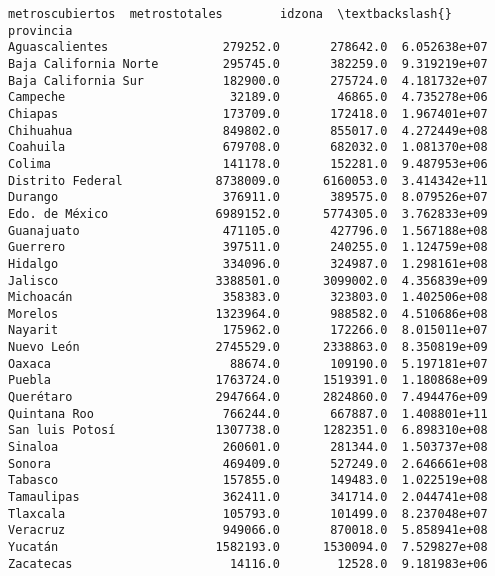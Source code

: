 \documentclass[11pt]{article}
\begin{document}
\begin{tcolorbox}[breakable, boxrule=.5pt, size=fbox, pad at break*=1mm, opacityfill=0]
\begin{Verbatim}[commandchars=\\\{\}]
                       metroscubiertos  metrostotales        idzona  \textbackslash{}
provincia
Aguascalientes                279252.0       278642.0  6.052638e+07
Baja California Norte         295745.0       382259.0  9.319219e+07
Baja California Sur           182900.0       275724.0  4.181732e+07
Campeche                       32189.0        46865.0  4.735278e+06
Chiapas                       173709.0       172418.0  1.967401e+07
Chihuahua                     849802.0       855017.0  4.272449e+08
Coahuila                      679708.0       682032.0  1.081370e+08
Colima                        141178.0       152281.0  9.487953e+06
Distrito Federal             8738009.0      6160053.0  3.414342e+11
Durango                       376911.0       389575.0  8.079526e+07
Edo. de México               6989152.0      5774305.0  3.762833e+09
Guanajuato                    471105.0       427796.0  1.567188e+08
Guerrero                      397511.0       240255.0  1.124759e+08
Hidalgo                       334096.0       324987.0  1.298161e+08
Jalisco                      3388501.0      3099002.0  4.356839e+09
Michoacán                     358383.0       323803.0  1.402506e+08
Morelos                      1323964.0       988582.0  4.510686e+08
Nayarit                       175962.0       172266.0  8.015011e+07
Nuevo León                   2745529.0      2338863.0  8.350819e+09
Oaxaca                         88674.0       109190.0  5.197181e+07
Puebla                       1763724.0      1519391.0  1.180868e+09
Querétaro                    2947664.0      2824860.0  7.494476e+09
Quintana Roo                  766244.0       667887.0  1.408801e+11
San luis Potosí              1307738.0      1282351.0  6.898310e+08
Sinaloa                       260601.0       281344.0  1.503737e+08
Sonora                        469409.0       527249.0  2.646661e+08
Tabasco                       157855.0       149483.0  1.022519e+08
Tamaulipas                    362411.0       341714.0  2.044741e+08
Tlaxcala                      105793.0       101499.0  8.237048e+07
Veracruz                      949066.0       870018.0  5.858941e+08
Yucatán                      1582193.0      1530094.0  7.529827e+08
Zacatecas                      14116.0        12528.0  9.181983e+06


\end{Verbatim}
\end{tcolorbox}
\end{document}
